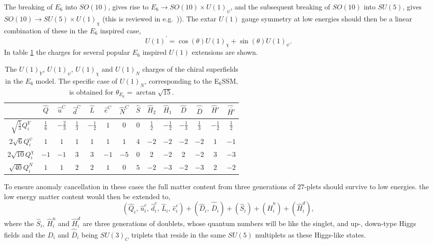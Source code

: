 \documentclass[preprint,amsmath,amssymb,aps,superscriptaddress,prd,showpacs,floatfix]{revtex4-1}
\newcommand{\be}{\begin{equation}}
\newcommand{\ee}{\end{equation}}
\begin{document}
The breaking of $E_6$ into $SO(10)$, gives rise to $E_6\to
SO(10)\times U(1)_{\psi}$, and the subsequent breaking of $SO(10)$
into $SU(5)$, gives $SO(10)\to SU(5)\times U(1)_{\chi}$ (this is
reviewed in e.g.~\cite{Langacker:2008yv})). The extar $U(1)$ gauge symmetry at low energies should then be a linear combination of these in the $E_6$ inspired case,
\be
U(1)^\prime = \cos(\theta) U(1)_{\chi} + \sin(\theta) U(1)_{\psi}.
\ee In table \ref{tab:E6charges} the charges for several popular $E_6$ inspired $U(1)$ extensions are shown.
\begin{table}[h]
\centering
\begin{ruledtabular}
\begin{tabular}{cccccccccccccc}
 & $\hat{Q}$ & $\hat{u}^C$ & $\hat{d}^C$ & $\hat{L}$ & $\hat{e}^C$ & $\hat{N}^C$ & $\hat{S}$ & $\hat{H}_2$ & $\hat{H}_1$ & $\hat{D}$ & $\hat{\overline{D}}$ & $\hat{H}'$ & $\hat{\overline{H'}}$ \\[1mm]
\hline
$\sqrt{\frac{5}{3}}Q_i^Y$ & $\frac{1}{6}$ & $-\frac{2}{3}$ & $\frac{1}{3}$ & $-\frac{1}{2}$ & $1$ & $0$ & $0$ & $\frac{1}{2}$ & $-\frac{1}{2}$ & $-\frac{1}{3}$ & $\frac{1}{3}$ & $-\frac{1}{2}$ & $\frac{1}{2}$ \\[1mm]
$2\sqrt{6}Q_i^\psi$ & $1$ & $1$ & $1$ & $1$ & $1$ & $1$ & $4$ & $-2$ & $-2$ & $-2$ & $-2$ & $1$ & $-1$\\[1mm]
$2\sqrt{10}Q_i^\chi$ & $-1$ & $-1$ & $3$ & $3$ & $-1$ & $-5$ & $0$ & $2$ & $-2$ & $2$ & $-2$ & $3$ & $-3$\\[1mm]
$\sqrt{40}Q_i^N$ & $1$ & $1$ & $2$ & $2$ & $1$ & $0$ & $5$ & $-2$ & $-3$ & $-2$ & $-3$ & $2$ & $-2$ \\[1mm]
\end{tabular}
\end{ruledtabular}
\caption{The $U(1)_Y$, $U(1)_\psi$, $U(1)_\chi$ and $U(1)_N$ charges of the chiral superfields in the $E_6$ model. The specific case of $U(1)_N$, corresponding to the E$_6$SSM, is obtained for $\theta_{E_6}=\arctan\sqrt{15}$.}
\label{tab:E6charges}
\end{table}

To ensure anomaly cancellation in these cases the full matter content
from three generations of $27$-plets should survive to low energies.
the low energy matter content would then be extended to, \be
(\hat{Q}_i,\,\hat{u}^c_i,\,\hat{d}^c_i,\,\hat{L}_i,\,\hat{e}^c_i)
+(\hat{D}_i,\,\hat{\overline{D}}_i)+(\hat{S}_{i})+(\hat{H}^u_i)+(\hat{H}^d_i),\ee
where the $\hat{S}_{i}$, $\hat{H}^u_i$ and $\hat{H}^d_i$ are three
generations of doublets, whose quantum numbers will be like the
singlet, and up-, down-type Higgs fields and the $\hat{D}_i$ and
$\hat{\overline{D}}_i$ being $SU(3)_C$ triplets that reside in the same $SU(5)$
multiplets as these Higgs-like states.
\end{document}
